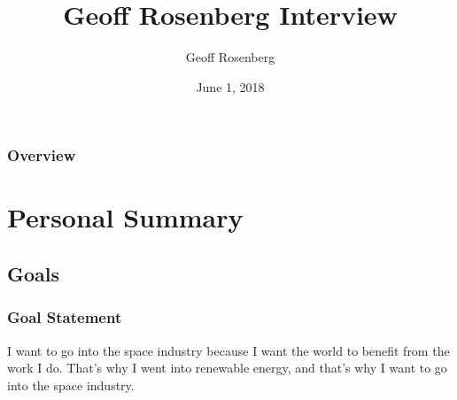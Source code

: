 \documentclass[aspectratio=169]{beamer}
\title[Summary Presentation]{Geoff Rosenberg Interview} %
\author{Geoff Rosenberg} %
\institute[] %
{
\textit{Geoff.Rosenberg@gmail.com} %
}
\date{June 1, 2018} %
\begin{document}
\begin{frame}
\titlepage %
\end{frame}

\begin{frame}
\frametitle{Overview} %
\tableofcontents %
\end{frame}


\section{Personal Summary} %


\subsection{Goals}
\begin{frame}
  \frametitle{Goal Statement}
  I want to go into the space industry because I want the world to
  benefit from the work I do.  That's why I went into renewable
  energy, and that's why I want to go into the space industry.
\end{frame}
\end{document}
